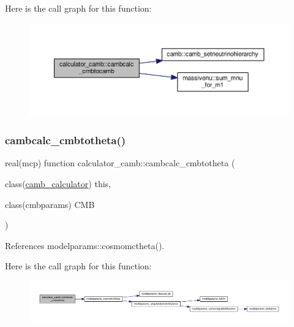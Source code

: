 Here is the call graph for this function\+:
\nopagebreak
\begin{figure}[H]
\begin{center}
\leavevmode
\includegraphics[width=350pt]{namespacecalculator__camb_a10914a67c9b3a93d74382c9c9adf0983_cgraph}
\end{center}
\end{figure}
\mbox{\label{namespacecalculator__camb_a88bb5f71c4e4784315929d98702a1214}} 
\subsubsection{\texorpdfstring{cambcalc\+\_\+cmbtotheta()}{cambcalc\_cmbtotheta()}}
{\footnotesize\ttfamily real(mcp) function calculator\+\_\+camb\+::cambcalc\+\_\+cmbtotheta (\begin{DoxyParamCaption}\item[{class(\mbox{\hyperlink{structcalculator__camb_1_1camb__calculator}{camb\+\_\+calculator}})}]{this,  }\item[{class(cmbparams)}]{C\+MB }\end{DoxyParamCaption})\hspace{0.3cm}{\ttfamily [private]}}



References modelparams\+::cosmomctheta().

Here is the call graph for this function\+:
\nopagebreak
\begin{figure}[H]
\begin{center}
\leavevmode
\includegraphics[width=350pt]{namespacecalculator__camb_a88bb5f71c4e4784315929d98702a1214_cgraph}
\end{center}
\end{figure}
\mbox{\label{namespacecalculator__camb_a44d780a147bc9cea89b7ebe9a071b98a}} 
